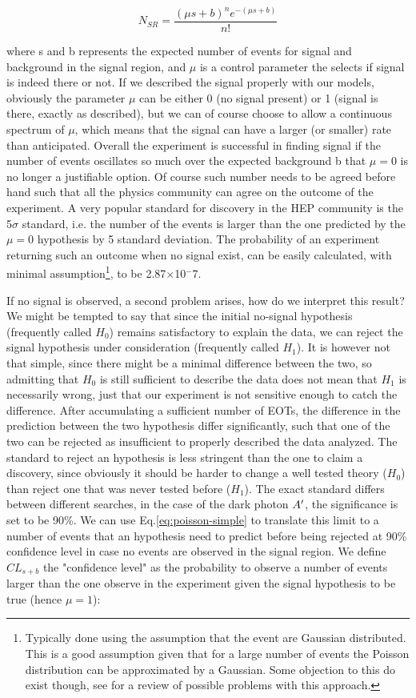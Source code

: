 \begin{equation}
  \label{eq:poisson-simple}
  N_{SR} = \frac{(\mu s + b)^ne^{-(\mu s + b)}}{n!}
\end{equation}

where s and b represents the expected number of events for signal and background in the signal region, and $\mu$ is a control parameter the selects if signal is indeed there or not. If we described the signal properly with our models, obviously the parameter $\mu$ can be either 0 (no signal present) or 1 (signal is there, exactly as described), but we can of course choose to allow a continuous spectrum of $\mu$, which means that the signal can have a larger (or smaller) rate than anticipated. Overall the experiment is successful in finding signal if the number of events oscillates so much over the expected background b that $\mu = 0$ is no longer a justifiable option. Of course such number needs to be agreed before hand such that all the physics community can agree on the outcome of the experiment. A very popular standard for discovery in the HEP community is the 5$\sigma$ standard, i.e. the number of the events is larger than the one predicted by the $\mu = 0$ hypothesis by 5 standard deviation. The probability of an experiment returning such an outcome when no signal exist, can be easily calculated, with minimal assumption\footnote{Typically done using the assumption that the event are Gaussian distributed. This is a good assumption given that for a large number of events the Poisson distribution can be approximated by a Gaussian. Some objection to this do exist though, see \cite{lyons2008} for a review of possible problems with this approach.}, to be 2.87$\times$10$^-7$.

If no signal is observed, a second problem arises, how do we interpret this result? We might be tempted to say that since the initial no-signal hypothesis (frequently called $H_0$) remains satisfactory to explain the data, we can reject the signal hypothesis under consideration (frequently called $H_1$). It is however not that simple, since there might be a minimal difference between the two, so admitting that $H_0$ is still sufficient to describe the data does not mean that $H_1$ is necessarily wrong, just that our experiment is not sensitive enough to catch the difference. After accumulating a sufficient number of EOTs, the difference in the prediction between the two hypothesis differ significantly, such that one of the two can be rejected as insufficient to properly described the data analyzed. The standard to reject an hypothesis is less stringent than the one to claim a discovery, since obviously it should be harder to change a well tested theory ($H_0$) than reject one that was never tested before ($H_1$). The exact standard differs between different searches, in the case of the dark photon $A'$, the significance is set to be 90\%. We can use Eq.\ref{eq:poisson-simple} to translate this limit to a number of events that an hypothesis need to predict before being rejected at 90\% confidence level in case no events are observed in the signal region. We define $CL_{s+b}$ the "confidence level" as the probability to observe a number of events larger than the one observe in the experiment given the signal hypothesis to be true (hence $\mu = 1$):

